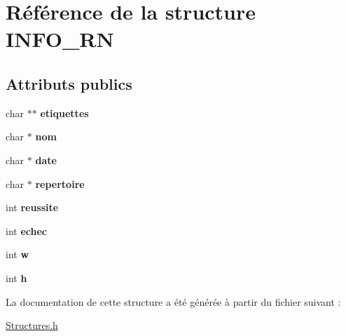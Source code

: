 \hypertarget{structINFO__RN}{}\section{Référence de la structure I\+N\+F\+O\+\_\+\+RN}
\label{structINFO__RN}
\subsection*{Attributs publics}
\begin{DoxyCompactItemize}
\item 
char $\ast$$\ast$ {\bfseries etiquettes}\hypertarget{structINFO__RN_abc9704518ac93f743cfebf1baa32a80b}{}\label{structINFO__RN_abc9704518ac93f743cfebf1baa32a80b}

\item 
char $\ast$ {\bfseries nom}\hypertarget{structINFO__RN_a703843a6712fdf0f2b04cd5b809c644c}{}\label{structINFO__RN_a703843a6712fdf0f2b04cd5b809c644c}

\item 
char $\ast$ {\bfseries date}\hypertarget{structINFO__RN_a35f15519beb59c036debb398bb118f46}{}\label{structINFO__RN_a35f15519beb59c036debb398bb118f46}

\item 
char $\ast$ {\bfseries repertoire}\hypertarget{structINFO__RN_a18461fa670221134de73e534b777628c}{}\label{structINFO__RN_a18461fa670221134de73e534b777628c}

\item 
int {\bfseries reussite}\hypertarget{structINFO__RN_a3cab3947c958e59dfe3cee9bc27c2e04}{}\label{structINFO__RN_a3cab3947c958e59dfe3cee9bc27c2e04}

\item 
int {\bfseries echec}\hypertarget{structINFO__RN_a7be6e5b6b85d6f54701cfcb4decf5f4e}{}\label{structINFO__RN_a7be6e5b6b85d6f54701cfcb4decf5f4e}

\item 
int {\bfseries w}\hypertarget{structINFO__RN_a5f950649165382855f5b659f61d75487}{}\label{structINFO__RN_a5f950649165382855f5b659f61d75487}

\item 
int {\bfseries h}\hypertarget{structINFO__RN_ac0d2599d6266859202d791a041f14ae3}{}\label{structINFO__RN_ac0d2599d6266859202d791a041f14ae3}

\end{DoxyCompactItemize}


La documentation de cette structure a été générée à partir du fichier suivant \+:\begin{DoxyCompactItemize}
\item 
\hyperlink{Structures_8h}{Structures.\+h}\end{DoxyCompactItemize}
